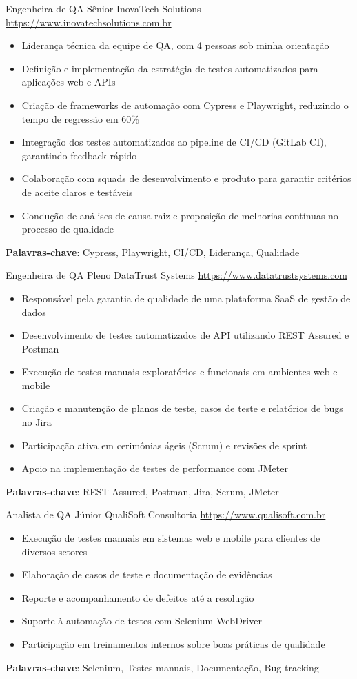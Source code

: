 \documentclass[a4paper, serif, 10pt]{moderncv}
\begin{document}
        {Engenheira de QA Sênior}
        {InovaTech Solutions}
        {\url{https://www.inovatechsolutions.com.br}}
        {}
        {\begin{itemize}
\item Liderança técnica da equipe de QA, com 4 pessoas sob minha orientação
\item Definição e implementação da estratégia de testes automatizados para aplicações web e APIs
\item Criação de frameworks de automação com Cypress e Playwright, reduzindo o tempo de regressão em 60\%
\item Integração dos testes automatizados ao pipeline de CI/CD (GitLab CI), garantindo feedback rápido
\item Colaboração com squads de desenvolvimento e produto para garantir critérios de aceite claros e testáveis
\item Condução de análises de causa raiz e proposição de melhorias contínuas no processo de qualidade
\end{itemize}
\textbf{Palavras-chave}: Cypress, Playwright, CI/CD, Liderança, Qualidade}

        {Engenheira de QA Pleno}
        {DataTrust Systems}
        {\url{https://www.datatrustsystems.com}}
        {}
        {\begin{itemize}
\item Responsável pela garantia de qualidade de uma plataforma SaaS de gestão de dados
\item Desenvolvimento de testes automatizados de API utilizando REST Assured e Postman
\item Execução de testes manuais exploratórios e funcionais em ambientes web e mobile
\item Criação e manutenção de planos de teste, casos de teste e relatórios de bugs no Jira
\item Participação ativa em cerimônias ágeis (Scrum) e revisões de sprint
\item Apoio na implementação de testes de performance com JMeter
\end{itemize}
\textbf{Palavras-chave}: REST Assured, Postman, Jira, Scrum, JMeter}

        {Analista de QA Júnior}
        {QualiSoft Consultoria}
        {\url{https://www.qualisoft.com.br}}
        {}
        {\begin{itemize}
\item Execução de testes manuais em sistemas web e mobile para clientes de diversos setores
\item Elaboração de casos de teste e documentação de evidências
\item Reporte e acompanhamento de defeitos até a resolução
\item Suporte à automação de testes com Selenium WebDriver
\item Participação em treinamentos internos sobre boas práticas de qualidade
\end{itemize}
\textbf{Palavras-chave}: Selenium, Testes manuais, Documentação, Bug tracking}
\end{document}

